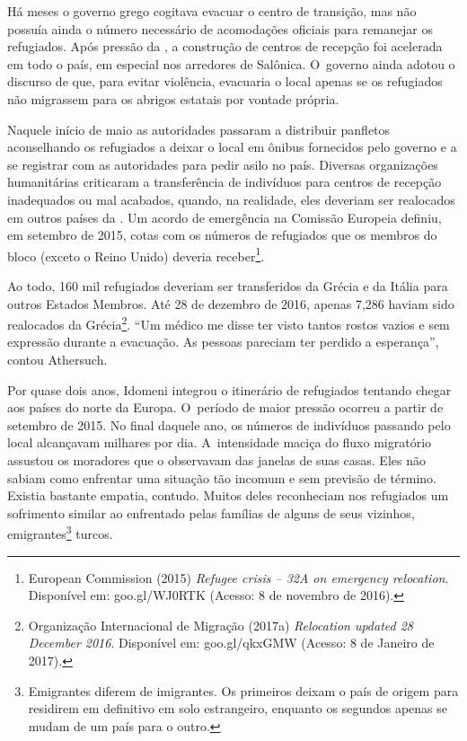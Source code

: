 Há meses o governo grego cogitava evacuar o centro de transição, mas não
possuía ainda o número necessário de acomodações oficiais para remanejar
os refugiados. Após pressão da , a construção de centros de recepção
foi acelerada em todo o país, em especial nos arredores de Salônica. O~governo ainda adotou o discurso de que, para evitar violência, evacuaria
o local apenas se os refugiados não migrassem para os abrigos estatais
por vontade própria.

Naquele início de maio as autoridades passaram a distribuir panfletos
aconselhando os refugiados a deixar o local em ônibus fornecidos pelo
governo e a se registrar com as autoridades para pedir asilo no
país. Diversas organizações humanitárias criticaram a transferência de
indivíduos para centros de recepção inadequados ou mal acabados, quando,
na realidade, eles deveriam ser realocados em outros países da . Um
acordo de emergência na Comissão Europeia definiu, em setembro de 2015,
cotas com os números de refugiados que os membros do bloco (exceto o
Reino Unido) deveria receber\footnote{ European Commission (2015) \emph{Refugee crisis
-- 32A on emergency relocation}. Disponível em:
goo.gl/WJ0RTK
(Acesso: 8
de novembro de 2016).}.

Ao todo, 160 mil refugiados deveriam ser transferidos da Grécia e da
Itália para outros Estados Membros. Até 28 de dezembro de 2016, apenas
7,286 haviam sido realocados da Grécia\footnote{ Organização Internacional de Migração (2017a)
\emph{Relocation updated 28 December 2016}. Disponível em:
goo.gl/qkxGMW
(Acesso: 8 de Janeiro de 2017).}. ``Um médico me
disse ter visto tantos rostos vazios e sem expressão durante a
evacuação. As pessoas pareciam ter perdido a esperança'', contou
Athersuch.

Por quase dois anos, Idomeni integrou o itinerário de refugiados
tentando chegar aos países do norte da Europa. O~período de maior
pressão ocorreu a partir de setembro de 2015. No final daquele ano, os
números de indivíduos passando pelo local alcançavam milhares por dia. A~intensidade maciça do fluxo migratório assustou
os moradores que o observavam das janelas de suas casas.
Eles não sabiam como enfrentar uma situação
tão incomum e sem previsão de término. Existia bastante empatia,
contudo. Muitos deles reconheciam nos refugiados um sofrimento similar
ao enfrentado pelas famílias de alguns de seus vizinhos,
emigrantes\footnote{ Emigrantes diferem de imigrantes. Os primeiros
deixam o país de origem para residirem em definitivo em solo
estrangeiro, enquanto os segundos apenas se mudam de um país para o
outro.}  turcos.

